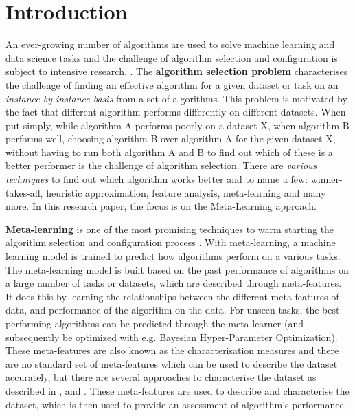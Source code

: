\chapter{Introduction}
An ever-growing number of algorithms are used to solve machine learning and data science tasks and the challenge of algorithm selection and configuration is subject to intensive research.  \citep{bischl-et-al,brazdil:p,calandra-et-al,collins-et-al2018,romero-et-al,vartak-et-al}. The \textbf{algorithm selection problem} characterises the challenge of finding an effective algorithm for a given dataset or task on an \textit{instance-by-instance basis} from a set of algorithms. This problem is motivated by the fact that different algorithm performs differently on different datasets. When put simply, while algorithm A performs poorly on a dataset X, when algorithm B performs well, choosing algorithm B over algorithm A for the given dataset X, without having to run both algorithm A and B to find out which of these is a better performer is the challenge of algorithm selection. There are \textit{various techniques} to find out which algorithm works better and to name a few: winner-takes-all, heuristic approximation, feature analysis,  meta-learning and many more. In this research paper, the focus is on the Meta-Learning approach.

\textbf{Meta-learning} is one of the most promising techniques to warm starting the algorithm selection and configuration process \citep{hutter-et-al}. With meta-learning, a machine learning model is trained to predict how algorithms perform on a various tasks. The meta-learning model is built based on the past performance of algorithms on a large number of tasks or datasets, which are described through meta-features. It does this by learning the relationships between the different meta-features of data, and performance of the algorithm on the data. For unseen tasks, the best performing algorithms can be predicted through the meta-learner (and subsequently be optimized with e.g. Bayesian Hyper-Parameter Optimization). These meta-features are also known as the characterisation measures and there are no standard set of meta-features which can be used to describe the dataset accurately, but there are several approaches to characterise the dataset as described in \citep{feurer:m}, \citep{meta-features-1} and \citep{meta-features-2}. These meta-features are used to describe and characterise the dataset, which is then used to provide an assessment of algorithm's performance.

